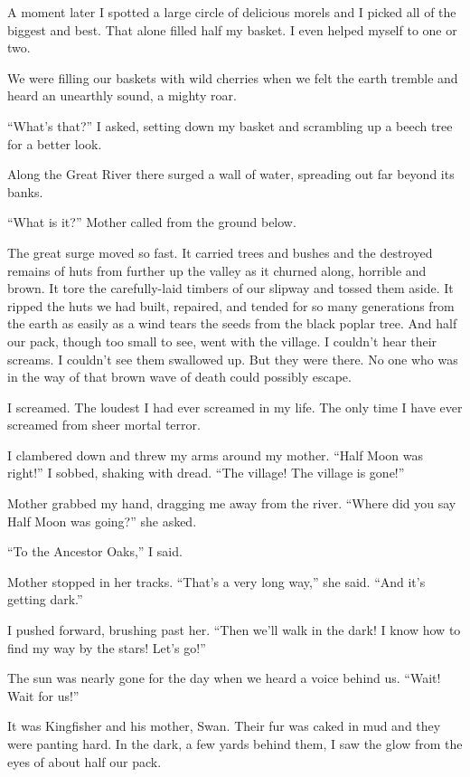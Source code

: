 A moment later I spotted a large circle of delicious morels and I picked all of the biggest and best. That alone filled half my basket. I even helped myself to one or two.

We were filling our baskets with wild cherries when we felt the earth tremble and heard an unearthly sound, a mighty roar.

``What's that?'' I asked, setting down my basket and scrambling up a beech tree for a better look.

Along the Great River there surged a wall of water, spreading out far beyond its banks.

``What is it?'' Mother called from the ground below.

The great surge moved so fast. It carried trees and bushes and the destroyed remains of huts from further up the valley as it churned along, horrible and brown. It tore the carefully-laid timbers of our slipway and tossed them aside. It ripped the huts we had built, repaired, and tended for so many generations from the earth as easily as a wind tears the seeds from the black poplar tree. And half our pack, though too small to see, went with the village. I couldn't hear their screams. I couldn't see them swallowed up. But they were there. No one who was in the way of that brown wave of death could possibly escape.

I screamed. The loudest I had ever screamed in my life. The only time I have ever screamed from sheer mortal terror.

I clambered down and threw my arms around my mother. ``Half Moon was right!'' I sobbed, shaking with dread. ``The village! The village is gone!''

Mother grabbed my hand, dragging me away from the river. ``Where did you say Half Moon was going?'' she asked.

``To the Ancestor Oaks,'' I said.

Mother stopped in her tracks. ``That's a very long way,'' she said. ``And it's getting dark.''

I pushed forward, brushing past her. ``Then we'll walk in the dark! I know how to find my way by the stars! Let's go!''

\secdiv

\noindent The sun was nearly gone for the day when we heard a voice behind us. ``Wait! Wait for us!''

It was Kingfisher and his mother, Swan. Their fur was caked in mud and they were panting hard. In the dark, a few yards behind them, I saw the glow from the eyes of about half our pack.

